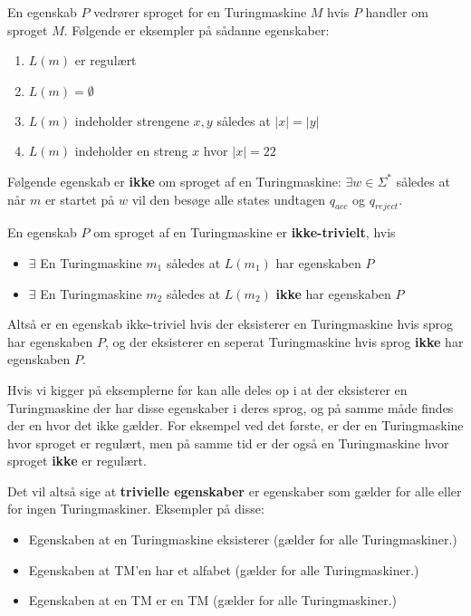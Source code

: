 En egenskab $P$ vedrører sproget for en Turingmaskine $M$ hvis $P$ handler om sproget $M$. Følgende er eksempler på sådanne egenskaber:
\begin{enumerate}
	\item $L(m)$ er regulært
	\item $L(m) = \emptyset$
	\item $L(m)$ indeholder strengene $x,y$ således at $|x| = |y|$
	\item $L(m)$ indeholder en streng $x$ hvor $|x| = 22$
\end{enumerate}
Følgende egenskab er \textbf{ikke} om sproget af en Turingmaskine: $\exists w \in \Sigma^{*}$ således at når $m$ er startet på $w$ vil den besøge alle states undtagen $q_{acc}$ og $q_{reject}$.

\begin{definition}
	En egenskab $P$ om sproget af en Turingmaskine er \textbf{ikke-trivielt}, hvis
	\begin{itemize}


		\item $\exists$ En Turingmaskine $m_{1}$ således at $L(m_{1})$ har egenskaben $P$
		\item $\exists$ En Turingmaskine $m_{2}$ således at $L(m_{2})$ \textbf{ikke} har egenskaben $P$
	\end{itemize}

\end{definition}

Altså er en egenskab ikke-triviel hvis der eksisterer en Turingmaskine hvis sprog har egenskaben $P$, og der eksisterer en seperat Turingmaskine hvis sprog \textbf{ikke} har egenskaben $P$.

Hvis vi kigger på eksemplerne før kan alle deles op i at der eksisterer en Turingmaskine der har disse egenskaber i deres sprog, og på samme måde findes der en hvor det ikke gælder. For eksempel ved det første, er der en Turingmaskine hvor sproget er regulært, men på samme tid er der også en Turingmaskine hvor sproget \textbf{ikke} er regulært.

Det vil altså sige at \textbf{trivielle egenskaber} er egenskaber som gælder for alle eller for ingen Turingmaskiner. Eksempler på disse:
\begin{itemize}
  \item Egenskaben at en Turingmaskine eksisterer (gælder for alle Turingmaskiner.)
  \item Egenskaben at TM'en har et alfabet (gælder for alle Turingmaskiner.)
  \item Egenskaben at en TM er en TM (gælder for alle Turingmaskiner.)
\end{itemize}

